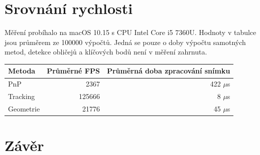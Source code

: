 \documentclass[12pt,a4paper,titlepage,final]{report}
\begin{document}
\section{Srovnání rychlosti}
Měření probíhalo na macOS 10.15 s CPU Intel Core i5 7360U. Hodnoty v tabulce jsou průměrem ze 100000 výpočtů. Jedná se pouze o doby výpočtu samotných metod, detekce obličejů a klíčových bodů není v měření zahrnuta.

\begin{table}[H]
\centering
\begin{tabular}{|l|r|r|}
\hline
Metoda    & \multicolumn{1}{l|}{Průměrné FPS} & Průměrná doba zpracování snímku \\ \hline
PnP       & 2367                              & 422 $\mu$s                      \\ \hline
Tracking  & 125666                            & 8 $\mu$s                        \\ \hline
Geometrie & 21776                             & 45 $\mu$s                       \\ \hline
\end{tabular}
\end{table}

\section{Závěr}

\nocite{est_for_mobile}

\begin{flushleft}
  
\end{flushleft}
\end{document}
